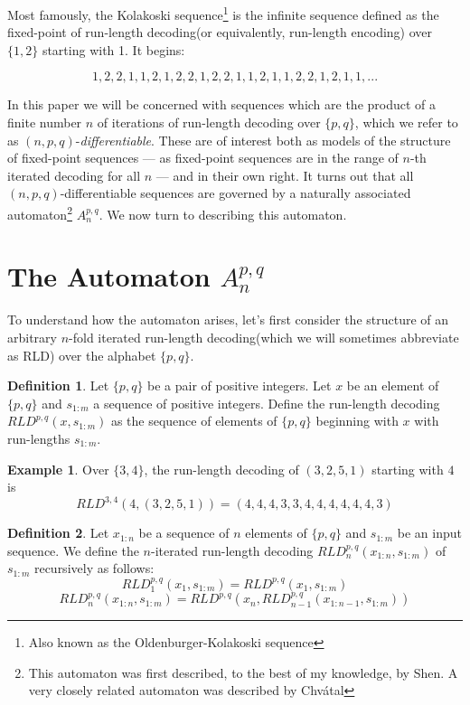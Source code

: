 \documentclass[11pt]{article}
\theoremstyle{plain}
\theoremstyle{definition}
\newtheorem{definition}{Definition}
\newtheorem{example}{Example}
\begin{document}
Most famously, the Kolakoski sequence\footnote{Also known as the Oldenburger-Kolakoski sequence\cite{oldenburger}}\cite{kolakoski} is the infinite sequence defined as the fixed-point of run-length decoding(or equivalently, run-length encoding) over $\{ 1, 2\}$ starting with 1. It begins:

$$ 1, 2, 2, 1, 1, 2, 1, 2, 2, 1, 2, 2, 1, 1, 2, 1, 1, 2, 2, 1, 2, 1, 1, ...  $$

In this paper we will be concerned with sequences which are the product of a finite number $n$ of iterations of run-length decoding over $\{p,q\}$, which we refer to as $(n, p,q)$-\emph{differentiable}. These are of interest both as models of the structure of fixed-point sequences --- as fixed-point sequences are in the range of $n$-th iterated decoding for all $n$ --- and in their own right. It turns out that all $(n,p,q)$-differentiable sequences are governed by a naturally associated automaton\footnote{This automaton was first described, to the best of my knowledge, by Shen\cite{shen}. A very closely related automaton was described by Chv{\'a}tal\cite{chvatal}} $A_n^{p,q}$. We now turn to describing this automaton.

\section{The Automaton $A_n^{p,q}$ }

To understand how the automaton arises, let's first consider the structure of an arbitrary $n$-fold iterated run-length decoding(which we will sometimes abbreviate as RLD) over the alphabet $\{p, q\}$. 

\begin{definition}
Let $\{p, q\}$ be a pair of positive integers. Let $x$ be an element of $\{p, q\}$ and $s_{1:m}$ a sequence of positive integers. Define the run-length decoding $RLD^{p,q}(x, s_{1:m})$ as the sequence of elements of $\{p, q\}$ beginning with $x$ with run-lengths $s_{1:m}$. 
\end{definition}

\begin{example}
Over $\{3, 4\}$, the run-length decoding of $(3, 2, 5, 1)$ starting with $4$ is 
$$RLD^{3,4}(4, (3, 2, 5, 1)) = (4, 4, 4, 3, 3, 4, 4, 4, 4, 4,4, 3)$$
\end{example}

\begin{definition}
Let $x_{1:n}$ be a sequence of $n$ elements of $\{p, q\}$ and $s_{1:m}$ be an input sequence. We define the $n$-iterated run-length decoding $RLD^{p,q}_n(x_{1:n}, s_{1:m})$ of $s_{1:m}$ recursively as follows: 
$$RLD^{p,q}_1 (x_1, s_{1:m}) = RLD^{p,q}(x_1, s_{1:m}) $$
$$RLD^{p,q}_n (x_{1:n}, s_{1:m}) = RLD^{p,q}(x_n, RLD^{p,q}_{n-1}(x_{1:n-1}, s_{1:m}))$$
\end{definition}
\end{document}
